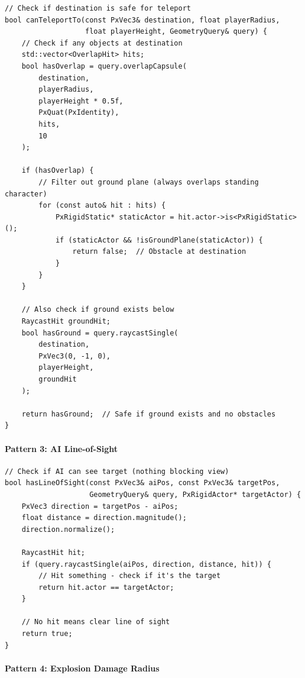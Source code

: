 \begin{lstlisting}[style=cpp]
// Check if destination is safe for teleport
bool canTeleportTo(const PxVec3& destination, float playerRadius,
                   float playerHeight, GeometryQuery& query) {
    // Check if any objects at destination
    std::vector<OverlapHit> hits;
    bool hasOverlap = query.overlapCapsule(
        destination,
        playerRadius,
        playerHeight * 0.5f,
        PxQuat(PxIdentity),
        hits,
        10
    );

    if (hasOverlap) {
        // Filter out ground plane (always overlaps standing character)
        for (const auto& hit : hits) {
            PxRigidStatic* staticActor = hit.actor->is<PxRigidStatic>();
            if (staticActor && !isGroundPlane(staticActor)) {
                return false;  // Obstacle at destination
            }
        }
    }

    // Also check if ground exists below
    RaycastHit groundHit;
    bool hasGround = query.raycastSingle(
        destination,
        PxVec3(0, -1, 0),
        playerHeight,
        groundHit
    );

    return hasGround;  // Safe if ground exists and no obstacles
}
\end{lstlisting}

\paragraph{Pattern 3: AI Line-of-Sight}

\begin{lstlisting}[style=cpp]
// Check if AI can see target (nothing blocking view)
bool hasLineOfSight(const PxVec3& aiPos, const PxVec3& targetPos,
                    GeometryQuery& query, PxRigidActor* targetActor) {
    PxVec3 direction = targetPos - aiPos;
    float distance = direction.magnitude();
    direction.normalize();

    RaycastHit hit;
    if (query.raycastSingle(aiPos, direction, distance, hit)) {
        // Hit something - check if it's the target
        return hit.actor == targetActor;
    }

    // No hit means clear line of sight
    return true;
}
\end{lstlisting}

\paragraph{Pattern 4: Explosion Damage Radius}

